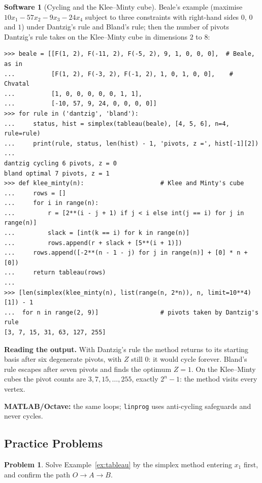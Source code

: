 \documentclass[11pt,a4paper]{article}
\numberwithin{equation}{section}
\theoremstyle{definition}
\newtheorem{software}[thm]{Software}
\newtheorem{problemx}{Problem}[subsection]
\newenvironment{problem}{\begin{problemx}}{\end{problemx}}
\begin{document}
\begin{software}[Cycling and the Klee--Minty cube]
\label{sw:cycling}
Beale's example (maximise $10x_1 - 57x_2 - 9x_3 - 24x_4$ subject to three constraints with right-hand sides $0$, $0$ and $1$) under Dantzig's rule and Bland's rule; then the number of pivots Dantzig's rule takes on the Klee--Minty cube in dimensions $2$ to $8$:
{\small\begin{verbatim}
>>> beale = [[F(1, 2), F(-11, 2), F(-5, 2), 9, 1, 0, 0, 0],  # Beale, as in
...          [F(1, 2), F(-3, 2), F(-1, 2), 1, 0, 1, 0, 0],    # Chvatal
...          [1, 0, 0, 0, 0, 0, 1, 1],
...          [-10, 57, 9, 24, 0, 0, 0, 0]]
>>> for rule in ('dantzig', 'bland'):
...     status, hist = simplex(tableau(beale), [4, 5, 6], n=4, rule=rule)
...     print(rule, status, len(hist) - 1, 'pivots, z =', hist[-1][2])
...
dantzig cycling 6 pivots, z = 0
bland optimal 7 pivots, z = 1
>>> def klee_minty(n):                     # Klee and Minty's cube
...     rows = []
...     for i in range(n):
...         r = [2**(i - j + 1) if j < i else int(j == i) for j in range(n)]
...         slack = [int(k == i) for k in range(n)]
...         rows.append(r + slack + [5**(i + 1)])
...     rows.append([-2**(n - 1 - j) for j in range(n)] + [0] * n + [0])
...     return tableau(rows)
...
>>> [len(simplex(klee_minty(n), list(range(n, 2*n)), n, limit=10**4)[1]) - 1
...  for n in range(2, 9)]                 # pivots taken by Dantzig's rule
[3, 7, 15, 31, 63, 127, 255]
\end{verbatim}}
\textbf{Reading the output.} With Dantzig's rule the method returns to its starting basis after six degenerate pivots, with $Z$ still $0$: it would cycle forever. Bland's rule escapes after seven pivots and finds the optimum $Z = 1$. On the Klee--Minty cubes the pivot counts are $3, 7, 15, \ldots, 255$, exactly $2^n - 1$:
the method visits every vertex.

\textbf{MATLAB/Octave:} the same loops; \texttt{linprog} uses anti-cycling safeguards and never cycles.
\end{software}

\subsection{Practice Problems}

\begin{problem}
Solve Example~\ref{ex:tableau} by the simplex method entering $x_1$ first, and confirm the path $O \to A \to B$.
\end{problem}
\end{document}
